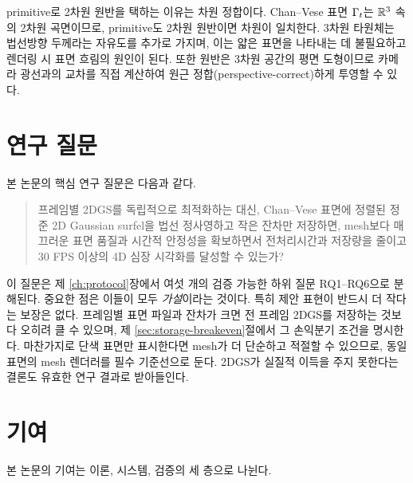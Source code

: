 primitive로 2차원 원반을 택하는 이유는 차원 정합이다. Chan--Vese 표면 $\Gamma_t$는
$\mathbb{R}^3$ 속의 2차원 곡면이므로, primitive도 2차원 원반이면 차원이 일치한다.
3차원 타원체는 법선방향 두께라는 자유도를 추가로 가지며, 이는 얇은 표면을 나타내는
데 불필요하고 렌더링 시 표면 흐림의 원인이 된다. 또한 원반은 3차원 공간의 평면
도형이므로 카메라 광선과의 교차를 직접 계산하여 원근 정합(perspective-correct)하게
투영할 수 있다.

\section{연구 질문}

본 논문의 핵심 연구 질문은 다음과 같다.

\begin{quote}
프레임별 2DGS를 독립적으로 최적화하는 대신, Chan--Vese 표면에 정렬된 정준 2D
Gaussian surfel을 법선 정사영하고 작은 잔차만 저장하면, mesh보다 매끄러운 표면
품질과 시간적 안정성을 확보하면서 전처리시간과 저장량을 줄이고 30 FPS 이상의
4D 심장 시각화를 달성할 수 있는가?
\end{quote}

이 질문은 제 \ref{ch:protocol}장에서 여섯 개의 검증 가능한 하위 질문
RQ1--RQ6으로 분해된다. 중요한 점은 이들이 모두 \emph{가설}이라는 것이다. 특히
제안 표현이 반드시 더 작다는 보장은 없다. 프레임별 표면 파일과 잔차가 크면
전 프레임 2DGS를 저장하는 것보다 오히려 클 수 있으며, 제
\ref{sec:storage-breakeven}절에서 그 손익분기 조건을 명시한다. 마찬가지로 단색
표면만 표시한다면 mesh가 더 단순하고 적절할 수 있으므로, 동일 표면의
mesh 렌더러를 필수 기준선으로 둔다. 2DGS가 실질적 이득을 주지 못한다는 결론도
유효한 연구 결과로 받아들인다.

\section{기여}

본 논문의 기여는 이론, 시스템, 검증의 세 층으로 나뉜다.


